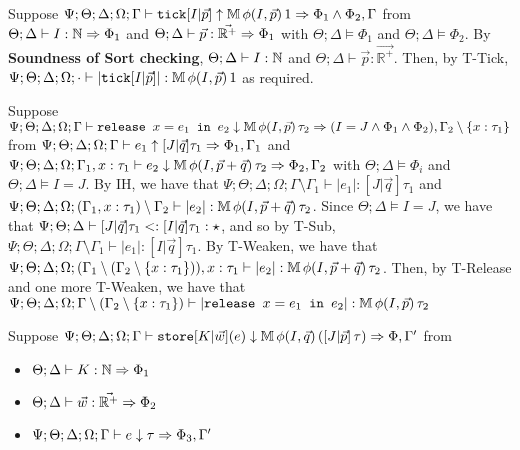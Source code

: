   \item[AT-Tick] Suppose $\Psi ; \Theta ; \Delta ; \Omega ; \Gamma \vdash \texttt{tick}[I|\vec{p}] \uparrow \mathbb{M} \, \phi(I,\vec{p})\, 1 \Rightarrow \Phi_1 \wedge \Phi_2,\Gamma$ from $\Theta ; \Delta \vdash I : \mathbb{N} \Rightarrow \Phi_1$ and $\Theta ; \Delta \vdash \vec{p} : \vec{\mathbb{R}^+} \Rightarrow \Phi_1$ with $\Theta ; \Delta \vDash \Phi_1$ and $\Theta ; \Delta \vDash \Phi_2$. By \textbf{Soundness of Sort checking}, $\Theta ; \Delta \vdash I : \mathbb{N}$ and $\Theta ; \Delta \vdash \vec{p} : \vec{\mathbb{R}^+}$. Then, by T-Tick, $\Psi ; \Theta ; \Delta ; \Omega ; \cdot \vdash |\texttt{tick}[I|\vec{p}]| : \mathbb{M} \, \phi(I,\vec{p})\, 1$ as required.
  
  \item[AT-Release] Suppose $\Psi ; \Theta ; \Delta ; \Omega ; \Gamma \vdash \texttt{release } x = e_1 \texttt{ in }e_2 \downarrow \mathbb{M} \, \phi(I,\vec{p}) \, \tau_2 \Rightarrow (I = J \wedge \Phi_1 \wedge \Phi_2), \Gamma_2 \setminus \{x : \tau_1\}$ from $\Psi ; \Theta ; \Delta ; \Omega ; \Gamma \vdash e_1 \uparrow [J | \vec{q}] \tau_1 \Rightarrow \Phi_1,\Gamma_1$ and $\Psi ; \Theta ; \Delta ; \Omega ; \Gamma_1, x : \tau_1 \vdash e_2 \downarrow \mathbb{M} \, \phi(I,\vec{p} + \vec{q}) \, \tau_2 \Rightarrow \Phi_2, \Gamma_2$ with $\Theta ;  \Delta \vDash \Phi_i$ and $\Theta ; \Delta \vDash I = J$. By IH, we have that $\Psi ; \Theta ; \Delta ; \Omega ; \Gamma \setminus \Gamma_1 \vdash |e_1| : [J | \vec{q}] \tau_1$  and $\Psi ; \Theta ; \Delta ; \Omega ; (\Gamma_1, x : \tau_1) \setminus \Gamma_2 \vdash |e_2| : \mathbb{M} \, \phi(I,\vec{p} + \vec{q}) \, \tau_2$. Since $\Theta ; \Delta \vDash I = J$, we have that $\Psi ; \Theta ; \Delta \vdash [J|\vec{q}] \tau_1 <: [I|\vec{q}] \tau_1 : \star$, and so by T-Sub, $\Psi ; \Theta ; \Delta ; \Omega ; \Gamma \setminus \Gamma_1 \vdash |e_1| : [I | \vec{q}] \tau_1$. By T-Weaken, we have that $\Psi ; \Theta ; \Delta ; \Omega ; (\Gamma_1 \setminus (\Gamma_2 \setminus \{x : \tau_1\})) , x : \tau_1 \vdash |e_2| : \mathbb{M} \, \phi(I,\vec{p} + \vec{q}) \, \tau_2$. Then, by T-Release and one more T-Weaken, we have that $\Psi ; \Theta ; \Delta ; \Omega ; \Gamma \setminus (\Gamma_2 \setminus \{x : \tau_1\}) \vdash |\texttt{release } x = e_1 \texttt{ in }e_2| : \mathbb{M} \, \phi(I,\vec{p}) \, \tau_2$
  \item[AT-Store] Suppose $\Psi ; \Theta ; \Delta ; \Omega ; \Gamma \vdash \texttt{store}[K|\vec{w}](e) \downarrow \mathbb{M} \, \phi(I,\vec{q}) \, ([J | \vec{p}] \, \tau) \Rightarrow \Phi, \Gamma'$ from
  \begin{itemize}
    \item $\Theta ; \Delta \vdash K : \mathbb{N} \Rightarrow \Phi_1$
    \item $\Theta ; \Delta \vdash \vec{w} : \vec{\mathbb{R}^+} \Rightarrow \Phi_2$
    \item $\Psi ; \Theta ; \Delta ; \Omega ; \Gamma \vdash e \downarrow \tau \Rightarrow \Phi_3,\Gamma'$
  \end{itemize}
